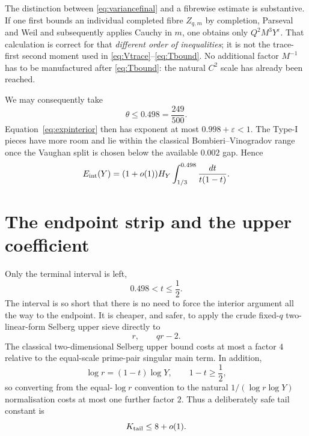 \documentclass{aomart}
\theoremstyle{definition}
\newcommand{\eps}{\varepsilon}
\newcommand{\1}{\mathbf 1}
\begin{document}
The distinction between \eqref{eq:variancefinal} and a fibrewise estimate is substantive.  If one first bounds an individual completed fibre $Z_{q,m}$ by completion, Parseval and Weil and subsequently applies Cauchy in $m$, one obtains only $Q^2M^3Y^\eps$.  That calculation is correct for that \emph{different order of inequalities}; it is not the trace-first second moment used in \eqref{eq:Vtrace}--\eqref{eq:Tbound}.  No additional factor $M^{-1}$ has to be manufactured after \eqref{eq:Tbound}: the natural $C^2$ scale has already been reached.

We may consequently take
\begin{equation}\label{eq:cutoff}
 \theta\le0.498=\frac{249}{500}.
\end{equation}
Equation~\eqref{eq:expinterior} then has exponent at most $0.998+\eps<1$.  The Type-I pieces have more room and lie within the classical Bombieri--Vinogradov range once the Vaughan split is chosen below the available $0.002$ gap.  Hence
\begin{equation}\label{eq:Eint}
 E_{\rm int}(Y)=(1+o(1))H_Y\int_{1/3}^{0.498}\frac{dt}{t(1-t)}.
\end{equation}

\section{The endpoint strip and the upper coefficient}\label{sec:endpoint}

Only the terminal interval is left,
\begin{equation}\label{eq:tailrange}
 0.498<t\le\frac12.
\end{equation}
The interval is so short that there is no need to force the interior argument all the way to the endpoint.  It is cheaper, and safer, to apply the crude fixed-$q$ two-linear-form Selberg upper sieve directly to
\[
 r,\qquad qr-2.
\]
The classical two-dimensional Selberg upper bound costs at most a factor $4$ relative to the equal-scale prime-pair singular main term.  In addition,
\[
 \log r=(1-t)\log Y,
 \qquad 1-t\ge\frac12,
\]
so converting from the equal-$\log r$ convention to the natural $1/(\log r\log Y)$ normalisation costs at most one further factor $2$.  Thus a deliberately safe tail constant is
\begin{equation}\label{eq:Ktail}
 K_{\rm tail}\le8+o(1).
\end{equation}
\end{document}
